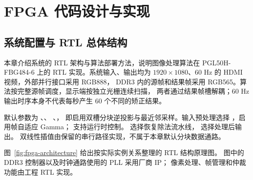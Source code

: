 \chapter{FPGA 代码设计与实现}
\label{chap:hardware}


\section{系统配置与 RTL 总体结构}
本章介绍系统的 RTL 架构与算法部署方法，说明图像处理算法在
PGL50H-FBG484-6 上的 RTL 实现。系统输入、输出均为
$1920\times1080$、60 Hz 的 HDMI 视频，外部并行接口采用 RGB888，
DDR3 内的源帧和结果帧采用 RGB565。算法按完整源帧调度，显示端按独立光栅连续扫描，
两者通过结果帧槽解耦；60 Hz 输出时序本身不代表每秒产生 60 个不同的矫正结果。

默认参数为 、、
、，
即启用双槽分块逆投影与最近邻采样。输入预处理选择
，启用帧自适应 Gamma；
 支持运行时控制。
 选择恢复除法流水线，
 选择处理后输出。
双线性插值由保留的串行路径实现，不属于本章默认分块数据通路。

图~\ref{fig:fpga-architecture} 给出按实际实例关系整理的 RTL 结构原理图。
图中的 DDR3 控制器以及时钟通路使用的 PLL 采用厂商 IP；
像素处理、帧管理和仲裁功能由工程 RTL 实现。


